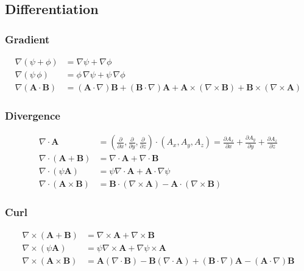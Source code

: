 \documentclass[11pt]{article}
\begin{document}
\begin{multicols}{2}
\subsection*{Differentiation}
\subsubsection*{Gradient}
\begin{align*}
 \nabla(\psi+\phi)&=\nabla\psi+\nabla\phi \\
 \nabla (\psi \, \phi) &= \phi \,\nabla \psi  + \psi \,\nabla \phi \\
 \nabla\left(\mathbf{A}\cdot\mathbf{B}\right)&=\left(\mathbf{A}\cdot\nabla\right)\mathbf{B}+\left(\mathbf{B}\cdot\nabla\right)\mathbf{A}+\mathbf{A}\times\left(\nabla\times\mathbf{B}\right)+\mathbf{B}\times\left(\nabla\times\mathbf{A}\right) 
\end{align*}

\subsubsection*{Divergence}
\begin{align*}
 \nabla\cdot\mathbf{A} &= \left(\frac{\partial}{\partial x},\frac{\partial}{\partial y},\frac{\partial}{\partial z}\right)\cdot\left(A_x,A_y,A_z\right) = \frac{\partial A_x}{\partial x} + \frac{\partial A_y}{\partial y} + \frac{\partial A_z}{\partial z}\\
 \nabla\cdot(\mathbf{A}+\mathbf{B})&=\nabla\cdot\mathbf{A}+\nabla\cdot\mathbf{B} \\
 \nabla\cdot\left(\psi\mathbf{A}\right)&=\psi\nabla\cdot\mathbf{A}+\mathbf{A}\cdot\nabla \psi \\
 \nabla\cdot\left(\mathbf{A}\times\mathbf{B}\right)&=\mathbf{B}\cdot (\nabla\times\mathbf{A})-\mathbf{A}\cdot(\nabla\times\mathbf{B}) 
\end{align*}

\subsubsection*{Curl}
\begin{align*}
 \nabla\times(\mathbf{A}+\mathbf{B})&=\nabla\times\mathbf{A}+\nabla\times\mathbf{B} \\
 \nabla\times\left(\psi\mathbf{A}\right)&=\psi\nabla\times\mathbf{A}+\nabla\psi\times\mathbf{A}\\
 \nabla\times\left(\mathbf{A}\times\mathbf{B}\right)&=\mathbf{A}\left(\nabla\cdot\mathbf{B}\right)-\mathbf{B}\left(\nabla\cdot\mathbf{A}\right)+\left(\mathbf{B}\cdot\nabla\right)\mathbf{A}-\left(\mathbf{A}\cdot\nabla\right)\mathbf{B}
\end{align*}


\end{multicols}
\end{document}
